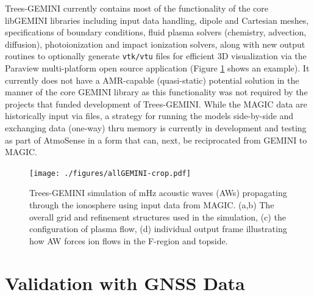 \documentclass[11pt,letterpaper]{article}
\begin{document}
Trees-GEMINI currently contains most of the functionality of the core libGEMINI libraries including input data handling, dipole and Cartesian meshes, specifications of boundary conditions, fluid plasma solvers (chemistry, advection, diffusion), photoionization and impact ionization solvers, along with new output routines to optionally generate \texttt{vtk/vtu} files for efficient 3D visualization via the Paraview multi-platform open source application (Figure \ref{fig:Trees-GEMINI} shows an example).  It currently does not have a AMR-capable (quasi-static) potential solution in the manner of the core GEMINI library as this functionality was not required by the projects that funded development of Trees-GEMINI.  While the MAGIC data are historically input via files, a strategy for running the models side-by-side and exchanging data (one-way) thru memory is currently in development and testing as part of AtmoSense in a form that can, next, be reciprocated from GEMINI to MAGIC.  %

\begin{figure}
  \texttt{[image: ./figures/allGEMINI-crop.pdf]}
  \caption{Trees-GEMINI simulation of mHz acoustic waves (AWs) propagating through the ionosphere using input data from MAGIC.  (a,b) The overall grid and refinement structures used in the simulation, (c) the configuration of plasma flow, (d) individual output frame illustrating how AW forces ion flows in the F-region and topside.}
  \label{fig:Trees-GEMINI}
\end{figure}



\section{Validation with GNSS Data}



\pagebreak
\setcounter{page}{1}

%

\end{document}
